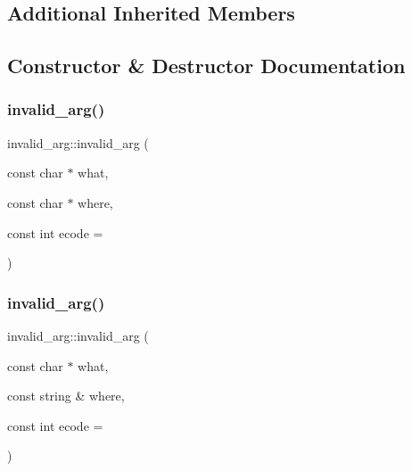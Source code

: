 \subsection*{Additional Inherited Members}


\subsection{Constructor \& Destructor Documentation}
\mbox{\label{classinvalid__arg_ab470c1e208290687c57ddb80ad7c91bf}} 
\subsubsection{\texorpdfstring{invalid\+\_\+arg()}{invalid\_arg()}\hspace{0.1cm}{\footnotesize\ttfamily [1/4]}}
{\footnotesize\ttfamily invalid\+\_\+arg\+::invalid\+\_\+arg (\begin{DoxyParamCaption}\item[{const char $\ast$}]{what,  }\item[{const char $\ast$}]{where,  }\item[{const int}]{ecode = {} }\end{DoxyParamCaption})}

\mbox{\label{classinvalid__arg_ac64346933956c640dc48166d3c11ea6d}} 
\subsubsection{\texorpdfstring{invalid\+\_\+arg()}{invalid\_arg()}\hspace{0.1cm}{\footnotesize\ttfamily [2/4]}}
{\footnotesize\ttfamily invalid\+\_\+arg\+::invalid\+\_\+arg (\begin{DoxyParamCaption}\item[{const char $\ast$}]{what,  }\item[{const string \&}]{where,  }\item[{const int}]{ecode = {} }\end{DoxyParamCaption})}

\mbox{\label{classinvalid__arg_afd1c07ada97de63dd8b2bf8d19753649}} 
